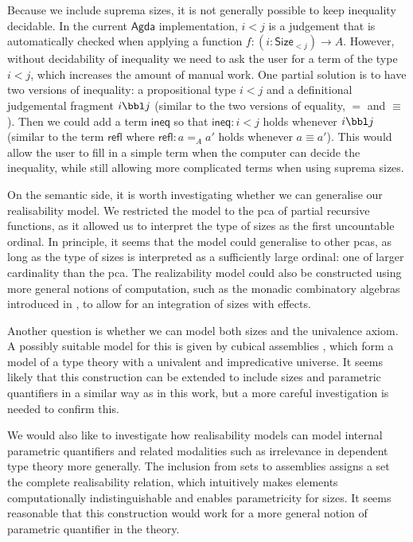 \documentclass[10pt,a4paper]{article}
\theoremstyle{definition}
\theoremstyle{remark}
\renewcommand{\.}{.\,} %
\renewcommand{\:}{:} %
\newcommand{\0}{\mathbf{0}}
\newcommand{\1}{\mathbf{1}}
\newcommand{\refl}{\mathsf{refl}}
\newcommand\<\langle
\renewcommand\>\rangle
\renewcommand\sf\mathsf
\theoremstyle{remark}
\begin{document}
Because we include suprema sizes, it is not generally possible to keep inequality decidable.
In the current \(\sf{Agda}\) implementation, \(i<j\) is a judgement that is automatically checked when applying a function \(f : (i : \sf{Size}_{<j}) \to A\). However, without decidability of inequality we need to ask the user for a term of the type \(i<j\), which increases the amount of manual work.
One partial solution is to have two versions of inequality: a propositional type \(i<j\) and a definitional judgemental fragment \(i\bbl j\) (similar to the two versions of equality, \(=\) and \(\equiv\)).
Then we could add a term \(\sf{ineq}\) so that \(\sf{ineq}:i<j\) holds whenever \(i\bbl j\) (similar to the term \(\sf{refl}\) where \(\refl:a=_Aa'\) holds whenever \(a\equiv a'\)).
This would allow the user to fill in a simple term when the computer can decide the inequality, while still allowing more complicated terms when using suprema sizes.

On the semantic side, it is worth investigating whether we can generalise our realisability model.
We restricted the model to the pca of partial recursive functions, as it allowed us to interpret the type of sizes as the first uncountable ordinal.
In principle, it seems that the model could generalise to other pcas, as long as the type of sizes is interpreted as a sufficiently large ordinal: one of larger cardinality than the pca. The realizability model could also be constructed using more general notions of computation, such as the monadic combinatory algebras introduced in \cite{Cohen-et-al-2025}, to allow for an integration of sizes with effects.

Another question is whether we can model both sizes and the univalence axiom. A possibly suitable model for this is given by cubical assemblies \cite{cubical-assemblies}, which form a model of a type theory with a univalent and impredicative universe. 
It seems likely that this construction can be extended to include sizes and parametric quantifiers in a similar way as in this work, but a more careful investigation is needed to confirm this.

We would also like to investigate how realisability models can model internal parametric quantifiers and related modalities such as irrelevance in dependent type theory more generally.
The inclusion from sets to assemblies assigns a set the complete realisability relation, which intuitively makes elements computationally indistinguishable and enables parametricity for sizes.
It seems reasonable that this construction would work for a more general notion of parametric quantifier in the theory.
\end{document}
